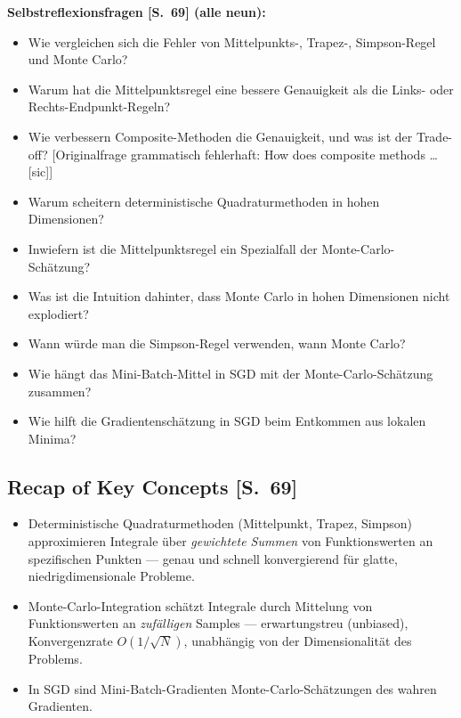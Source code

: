 \textbf{Selbstreflexionsfragen [S.~69] (alle neun):}
\begin{itemize}[itemsep=2pt]
  \item Wie vergleichen sich die Fehler von Mittelpunkts-, Trapez-, Simpson-Regel
        und Monte Carlo?
  \item Warum hat die Mittelpunktsregel eine bessere Genauigkeit als die Links- oder
        Rechts-Endpunkt-Regeln?
  \item Wie verbessern Composite-Methoden die Genauigkeit, und was ist der Trade-off?
        [Originalfrage grammatisch fehlerhaft: \glqq How does composite methods
        \ldots\grqq{} [sic]]
  \item Warum scheitern deterministische Quadraturmethoden in hohen Dimensionen?
  \item Inwiefern ist die Mittelpunktsregel ein Spezialfall der
        Monte-Carlo-Schätzung?
  \item Was ist die Intuition dahinter, dass Monte Carlo in hohen Dimensionen nicht
        explodiert?
  \item Wann würde man die Simpson-Regel verwenden, wann Monte Carlo?
  \item Wie hängt das Mini-Batch-Mittel in SGD mit der Monte-Carlo-Schätzung
        zusammen?
  \item Wie hilft die Gradientenschätzung in SGD beim Entkommen aus lokalen Minima?
\end{itemize}

\subsection{Recap of Key Concepts [S.~69]}
\begin{itemize}[itemsep=2pt]
  \item Deterministische Quadraturmethoden (Mittelpunkt, Trapez, Simpson)
        approximieren Integrale über \emph{gewichtete Summen} von Funktionswerten an
        spezifischen Punkten --- genau und schnell konvergierend für glatte,
        niedrigdimensionale Probleme.
  \item Monte-Carlo-Integration schätzt Integrale durch Mittelung von
        Funktionswerten an \emph{zufälligen} Samples --- erwartungstreu (unbiased),
        Konvergenzrate $O(1/\sqrt{N})$, unabhängig von der Dimensionalität des
        Problems.
  \item In SGD sind Mini-Batch-Gradienten Monte-Carlo-Schätzungen des wahren
        Gradienten.
\end{itemize}


